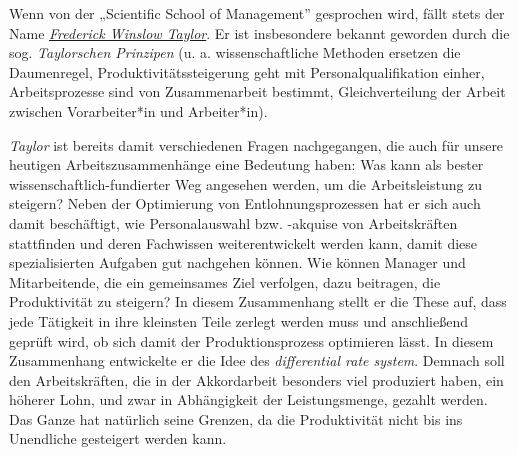 \documentclass[
  letterpaper,
]{book}
\begin{document}
Wenn von der „Scientific School of Management'' gesprochen wird, fällt
stets der Name
\href{https://en.wikipedia.org/wiki/Frederick_Winslow_Taylor}{\emph{Frederick
Winslow Taylor}}. Er ist insbesondere bekannt geworden durch die sog.
\emph{Taylorschen Prinzipen} (u. a. wissenschaftliche Methoden ersetzen
die Daumenregel, Produktivitätssteigerung geht mit Personalqualifikation
einher, Arbeitsprozesse sind von Zusammenarbeit bestimmt,
Gleichverteilung der Arbeit zwischen Vorarbeiter*in und Arbeiter*in).

\emph{Taylor} ist bereits damit verschiedenen Fragen nachgegangen, die
auch für unsere heutigen Arbeitszusammenhänge eine Bedeutung haben: Was
kann als bester wissenschaftlich-fundierter Weg angesehen werden, um die
Arbeitsleistung zu steigern? Neben der Optimierung von
Entlohnungsprozessen hat er sich auch damit beschäftigt, wie
Personalauswahl bzw. -akquise von Arbeitskräften stattfinden und deren
Fachwissen weiterentwickelt werden kann, damit diese spezialisierten
Aufgaben gut nachgehen können. Wie können Manager und Mitarbeitende, die
ein gemeinsames Ziel verfolgen, dazu beitragen, die Produktivität zu
steigern? In diesem Zusammenhang stellt er die These auf, dass jede
Tätigkeit in ihre kleinsten Teile zerlegt werden muss und anschließend
geprüft wird, ob sich damit der Produktionsprozess optimieren lässt. In
diesem Zusammenhang entwickelte er die Idee des \emph{differential rate
system}. Demnach soll den Arbeitskräften, die in der Akkordarbeit
besonders viel produziert haben, ein höherer Lohn, und zwar in
Abhängigkeit der Leistungsmenge, gezahlt werden. Das Ganze hat natürlich
seine Grenzen, da die Produktivität nicht bis ins Unendliche gesteigert
werden kann.
\end{document}
